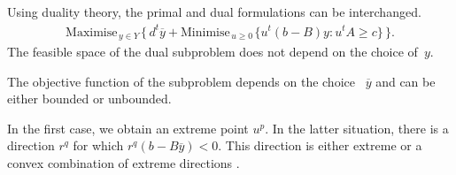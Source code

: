 \newpage
\subsection*{}


Using duality theory, the primal and dual formulations can be interchanged.
\begin{eqnarray*}
\label{bd4}  \textrm{Maximise}_{\, y \in Y \,} \{\,
d^t\overline{y} + \textrm{Minimise}_{\, u\geq 0 \,} \{ u^t(b-B)y
: u^tA \geq c\}\, \}.
\end{eqnarray*}
The feasible space of the dual subproblem does not depend on the choice of~$y$.

\vfill

 The objective function of the subproblem depends on the choice ~$\overline{y}$ and can be either bounded or unbounded. 


\begin{center}
\end{center}

\vfill


In the first case, we obtain an extreme point $u^p$. In the latter situation, there is a direction $r^q$ for which $r^q(b-B\overline{y}) < 0$.  This direction is either extreme or a convex combination of extreme directions \cite{costa09benders}. 
\vfill


\newpage
\subsection*{}

